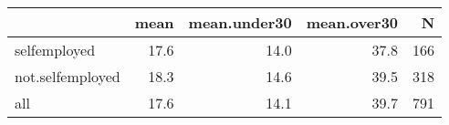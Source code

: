 \begin{table}[ht]
\centering
\begin{tabular}{lrrrr}
  \hline
 & mean & mean.under30 & mean.over30 & N \\ 
  \hline
selfemployed & 17.6 & 14.0 & 37.8 & 166 \\ 
  not.selfemployed & 18.3 & 14.6 & 39.5 & 318 \\ 
  all & 17.6 & 14.1 & 39.7 & 791 \\ 
   \hline
\end{tabular}
\end{table}
